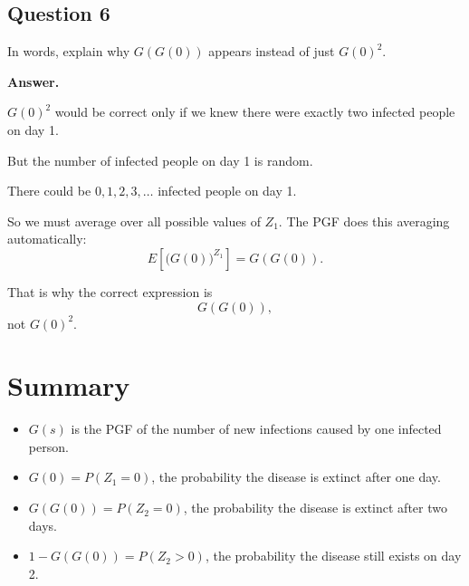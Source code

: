 \documentclass[12pt]{article}
\begin{document}
\subsection*{Question 6}

In words, explain why \(G(G(0))\) appears instead of just \(G(0)^2\).

\textbf{Answer.}

\(G(0)^2\) would be correct only if we knew there were exactly two infected people on day 1.

But the number of infected people on day 1 is random.

There could be \(0,1,2,3,\ldots\) infected people on day 1.

So we must average over all possible values of \(Z_1\). The PGF does this averaging automatically:
\[
E\left[\bigl(G(0)\bigr)^{Z_1}\right]=G(G(0)).
\]

That is why the correct expression is
\[
\boxed{G(G(0)),}
\]
not \(G(0)^2\).

\section{Summary}

\begin{itemize}
    \item \(G(s)\) is the PGF of the number of new infections caused by one infected person.
    \item \(G(0)=P(Z_1=0)\), the probability the disease is extinct after one day.
    \item \(G(G(0))=P(Z_2=0)\), the probability the disease is extinct after two days.
    \item \(1-G(G(0))=P(Z_2>0)\), the probability the disease still exists on day 2.
\end{itemize}
\end{document}
